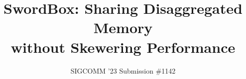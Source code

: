 \documentclass[sigconf,10pt]{acmart}
\newcommand{\sword}{SwordBox}
\begin{document}

\title{\sword: Sharing Disaggregated Memory\\ without Skewering Performance}

\author{SIGCOMM '23 Submission \#1142}




\maketitle



% 
% 
% 




% 


\balance
\vspace{-0.3cm}
{\footnotesize 
}
\vspace{-0.5cm}

\appendix

\end{document}
